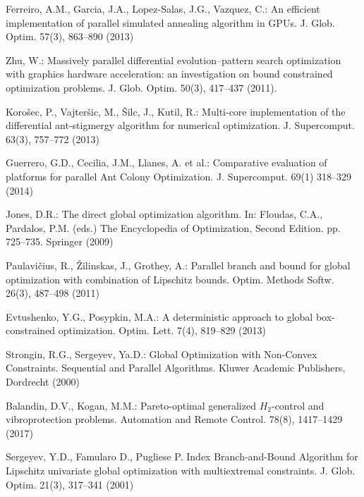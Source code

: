 \documentclass[smallextended]{svjour3}       %
\begin{document}
\begin{thebibliography}{}

Ferreiro, A.M., Garcia, J.A., Lopez-Salas, J.G., Vazquez, C.: An efficient implementation of parallel simulated annealing algorithm in GPUs. J. Glob. Optim. 57(3), 863--890 (2013)

Zhu, W.: Massively parallel differential evolution--pattern search optimization with graphics hardware acceleration: an investigation on bound constrained optimization problems. J. Glob. Optim. 50(3), 417--437 (2011).

Koro\v sec, P., Vajter\v sic, M.,  \v Silc, J., Kutil, R.: Multi-core implementation of the differential ant-stigmergy algorithm for numerical optimization. J. Supercomput. 63(3), 757--772 (2013)

Guerrero, G.D., Cecilia, J.M., Llanes, A. et al.: Comparative evaluation of platforms for parallel Ant Colony Optimization. J. Supercomput. 69(1) 318--329 (2014)

Jones, D.R.: The direct global optimization algorithm. In: Floudas, C.A., Pardalos, P.M. (eds.) The Encyclopedia of Optimization, Second Edition. pp. 725--735. Springer (2009)

Paulavi\v cius, R., \v Zilinskas, J., Grothey, A.: Parallel branch and bound for global optimization with combination of Lipschitz bounds. Optim. Methods Softw. 26(3), 487--498 (2011)

Evtushenko, Y.G., Posypkin, M.A.: A deterministic approach to global box-constrained optimization. Optim. Lett. 7(4), 819--829 (2013)

Strongin, R.G., Sergeyev, Ya.D.: Global Optimization with Non-Convex Constraints. Sequential and Parallel Algorithms. Kluwer Academic Publishers, Dordrecht (2000)


Balandin, D.V., Kogan, M.M.: Pareto-optimal generalized $H_2$-control and vibroprotection problems. Automation and Remote Control. 78(8), 1417--1429 (2017)


Sergeyev, Y.D., Famularo D., Pugliese P. Index Branch-and-Bound Algorithm for Lipschitz univariate global optimization with multiextremal constraints. J. Glob. Optim. 21(3), 317--341 (2001) 


\end{thebibliography}
\end{document}
